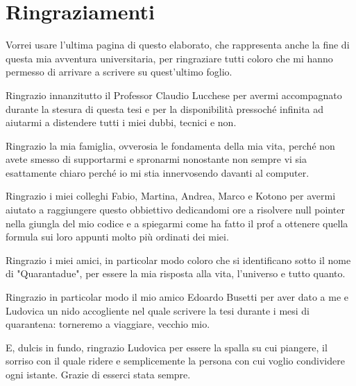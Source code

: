 \documentclass[12pt,a4paper,titlepage]{article}
\newenvironment{dedication}
	{\clearpage     
		\section*{Ringraziamenti}      %
		\thispagestyle{empty}%
		\vspace*{\stretch{1}}%
		\itshape             %
		\raggedleft          %
	}
	{\par %
		\vspace{\stretch{3}} %
		\clearpage           %
	}
\begin{document}
	\tableofcontents
	\newpage
	
	\newpage
	
	\newpage
	
	\newpage
	
	\newpage
	
	\newpage
	
	\newpage
	
	\cleardoublepage
	\begin{dedication}
		Vorrei usare l'ultima pagina di questo elaborato, che rappresenta anche la fine di questa mia avventura universitaria, per ringraziare tutti coloro che mi hanno permesso di arrivare a scrivere su quest'ultimo foglio. \vspace{\baselineskip}
		
		Ringrazio innanzitutto il Professor Claudio Lucchese per avermi accompagnato  durante la stesura di questa tesi e per la disponibilità pressoché infinita ad aiutarmi a distendere tutti i miei dubbi, tecnici e non. \vspace{\baselineskip}
		
		Ringrazio la mia famiglia, ovverosia le fondamenta della mia vita, perché non avete smesso di supportarmi e spronarmi nonostante non sempre vi sia esattamente chiaro perché io mi stia innervosendo davanti al computer. \vspace{\baselineskip}
		
		Ringrazio i miei colleghi Fabio, Martina, Andrea, Marco e Kotono per avermi aiutato a raggiungere questo obbiettivo dedicandomi ore a risolvere null pointer nella giungla del mio codice e a spiegarmi come ha fatto il prof a ottenere quella formula sui loro appunti molto più ordinati dei miei.\vspace{\baselineskip}
		
		Ringrazio i miei amici, in particolar modo coloro che si identificano sotto il nome di "Quarantadue", per essere la mia risposta alla vita, l'universo e tutto quanto.\vspace{\baselineskip}
		
		Ringrazio in particolar modo il mio amico Edoardo Busetti per aver dato a me e Ludovica un nido accogliente nel quale scrivere la tesi durante i mesi di quarantena: torneremo a viaggiare, vecchio mio.\vspace{\baselineskip}
		
		E, dulcis in fundo, ringrazio Ludovica per essere la spalla su cui piangere, il sorriso con il quale ridere e semplicemente la persona con cui voglio condividere ogni istante. Grazie di esserci stata sempre. 
		
	\end{dedication}
	\newpage
	\cleardoublepage
	\printbibliography
\end{document}
